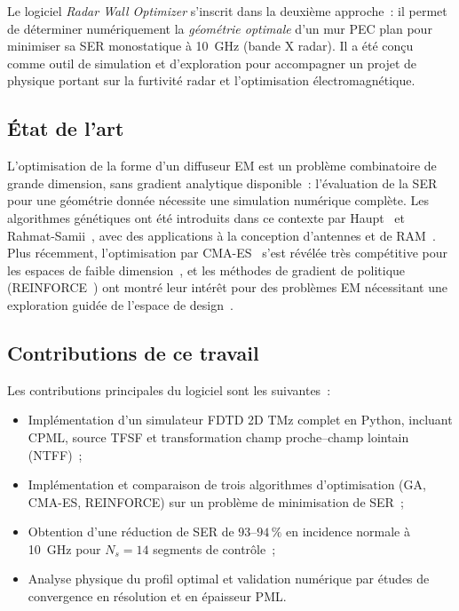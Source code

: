 \documentclass[12pt,a4paper]{article}
\begin{document}
Le logiciel \textit{Radar Wall Optimizer} s'inscrit dans la deuxième approche~: il
permet de déterminer numériquement la \textit{géométrie optimale} d'un mur PEC plan
pour minimiser sa SER monostatique à \SI{10}{\giga\hertz} (bande X radar). Il a été
conçu comme outil de simulation et d'exploration pour accompagner un projet de
physique portant sur la furtivité radar et l'optimisation électromagnétique.

\subsection{État de l'art}

L'optimisation de la forme d'un diffuseur EM est un problème combinatoire de
grande dimension, sans gradient analytique disponible~: l'évaluation de la SER pour
une géométrie donnée nécessite une simulation numérique complète. Les algorithmes
génétiques ont été introduits dans ce contexte par Haupt~\cite{Haupt1995} et
Rahmat-Samii~\cite{RahmatSamii1999}, avec des applications à la conception d'antennes
et de RAM~\cite{Michielssen1993,Weile1997}. Plus récemment, l'optimisation par
CMA-ES~\cite{Hansen2001} s'est révélée très compétitive pour les espaces de faible
dimension~\cite{Hansen2006}, et les méthodes de gradient de politique
(REINFORCE~\cite{Williams1992}) ont montré leur intérêt pour des problèmes
EM nécessitant une exploration guidée de l'espace de design~\cite{Peters2008}.

\subsection{Contributions de ce travail}

Les contributions principales du logiciel sont les suivantes~:
\begin{itemize}
    \item Implémentation d'un simulateur FDTD 2D TMz complet en Python, incluant
          CPML, source TFSF et transformation champ proche--champ lointain (NTFF)~;
    \item Implémentation et comparaison de trois algorithmes d'optimisation
          (GA, CMA-ES, REINFORCE) sur un problème de minimisation de SER~;
    \item Obtention d'une réduction de SER de $93$--$94\,\%$ en incidence normale à
          \SI{10}{\giga\hertz} pour $N_s = 14$ segments de contrôle~;
    \item Analyse physique du profil optimal et validation numérique par études
          de convergence en résolution et en épaisseur PML.
\end{itemize}
\end{document}
